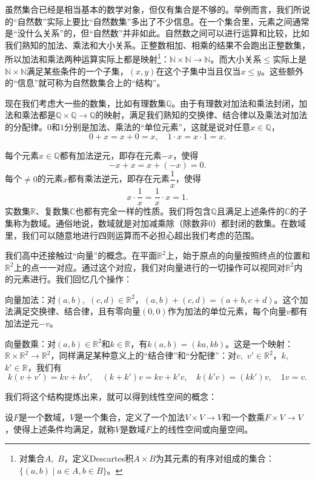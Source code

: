 虽然集合已经是相当基本的数学对象，但仅有集合是不够的。举例而言，我们所说的“自然数”实际上要比“自然数集”多出了不少信息。在一个集合里，元素之间通常是“没什么关系”的，但“自然数”并非如此。自然数之间可以进行运算和比较，比如我们熟知的加法、乘法和大小关系。正整数相加、相乘的结果不会跑出正整数集，所以加法和乘法两种运算实际上都是映射\footnote{对集合$A$,~$B$，定义Descartes积$A\times B$为其元素的有序对组成的集合：$\{(a,b)\mid a\in A,b\in B\}$。
}：$ \mathbb{N}\times\mathbb{N}\to \mathbb{N}$。而大小关系$\leq$实际上是$\mathbb{N}\times\mathbb{N}$满足某些条件的一个子集，$(x,y)$在这个子集中当且仅当$x\leqslant y$。这些额外的“信息”就可称为自然数集合上的“结构”。

现在我们考虑大一些的数集，比如有理数集$\mathbb{Q}$。由于有理数对加法和乘法封闭，加法和乘法都是$\mathbb{Q}\times\mathbb{Q}\to\mathbb{Q}$的映射，满足我们熟知的交换律、结合律以及乘法对加法的分配律。$0$和$1$分别是加法、乘法的“单位元素”，这就是说对任意$x\in\mathbb{Q}$，
\[0+x=x+0=x,\quad 1\cdot x=x\cdot 1=x. \]

每个元素$x\in\mathbb{Q}$都有加法逆元，即存在元素$-x$，使得\[-x+x=x+(-x)=0.\]每个$\neq 0$的元素$x$都有乘法逆元，即存在元素$\dfrac 1x$，使得\[x\cdot \dfrac{1}{x}=\dfrac{1}{x}\cdot x=1.\]实数集$\mathbb{R}$、复数集$\mathbb{C}$也都有完全一样的性质。我们将包含$\mathbb{Q}$且满足上述条件的$\mathbb{C}$的子集称为数域。通俗地说，数域就是对加减乘除（除数非$0$）都封闭的数集。在数域里，我们可以随意地进行四则运算而不必担心超出我们考虑的范围。

我们高中还接触过“向量”的概念。在平面$\mathbb{R}^2$上，始于原点的向量按照终点的位置和$\mathbb{R}^2$上的点一一对应。通过这个对应，我们对向量进行的一切操作可以视同对$\mathbb{R}^2$内的元素进行。我们回忆几个操作：

向量加法：对$(a,b)$,~$(c,d)\in\mathbb{R}^2$，$(a,b)+(c,d)=(a+b,c+d)$。这个加法满足交换律、结合律，且有零向量$(0,0)$作为加法的单位元素，每个向量$v$都有加法逆元$-v$。

向量数乘：对$(a,b)\in\mathbb{R}^2$和$k\in\mathbb{R}$，有$k (a,b)=(ka,kb)$。这是一个映射：$\mathbb{R}\times\mathbb{R}^2\to\mathbb{R}^2$，同样满足某种意义上的“结合律”和“分配律”：对$v$,~$v'\in \mathbb{R}^2$，$k$,~$k'\in\mathbb{R}$，我们有
\[k(v+v')=kv+kv',\quad (k+k')v=kv+k'v,\quad k(k'v)=(kk')v,\quad 1v=v.\]

我们将这个结构提炼出来，就可以得到线性空间的概念：

设$F$是一个数域，$V$是一个集合，定义了一个加法$V\times V\to V$和一个数乘$F\times V\to V$，使得上述条件均满足，就称$V$是数域$F$上的线性空间或向量空间。

